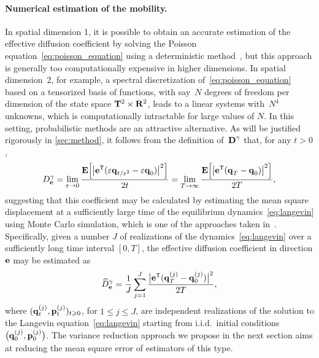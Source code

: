 \documentclass[11pt,a4paper]{article}
\begin{document}
\paragraph{Numerical estimation of the mobility.}
In spatial dimension 1,
it is possible to obtain an accurate estimation of the effective diffusion coefficient by solving the Poisson equation~\eqref{eq:poisson_equation} using a deterministic method~\cite{roussel2018spectral},
but this approach is generally too computationally expensive in higher dimensions.
In spatial dimension~2, for example,
a spectral discretization of~\eqref{eq:poisson_equation} based on a tensorized basis of functions,
with say~$N$ degrees of freedom per dimension of the state space $\mathbf T^2 \times \mathbf R^2$, leads to a linear systems with~$N^4$ unknowns,
which is computationally intractable for large values of $N$.
In this setting, probabilistic methods are an attractive alternative.
As will be justified rigorously in \cref{sec:method},
it follows from the definition of~$\boldsymbol{\mathbf D}^{\gamma}$ that,
for any $t > 0$,%
\begin{equation}
    \label{eq:einsteins_formula}
    D^{\gamma}_{\boldsymbol{\mathbf e}}
    =\lim_{\varepsilon \to 0} \frac{\mathbf{E}\Bigl[\bigl\lvert \boldsymbol{\mathbf e}^\mathsf T (\varepsilon \boldsymbol{\mathbf q}_{t/\varepsilon^2} - \varepsilon \boldsymbol{\mathbf q}_0) \bigr\rvert^2\Bigr]}{2 t}
    =\lim_{T \to \infty} \frac{\mathbf{E} \Bigl[\bigl\lvert \boldsymbol{\mathbf e}^\mathsf T (\boldsymbol{\mathbf q}_T - \boldsymbol{\mathbf q}_0) \bigr\rvert^2\Bigr]}{2T},
\end{equation}
suggesting that this coefficient may be calculated by
estimating the mean square displacement at a sufficiently large time of the equilibrium dynamics~\eqref{eq:langevin}
using Monte Carlo simulation,
which is one of the approaches taken in~\cite{MR2427108}.
Specifically, given a number $J$ of realizations of the dynamics~\eqref{eq:langevin} over a sufficiently long time interval $[0, T]$,
the effective diffusion coefficient in direction $\boldsymbol{\mathbf e}$ may be estimated as
\begin{equation}
    \label{eq:naive_estimator}
    \widehat D^{\gamma}_{\boldsymbol{\mathbf e}}
    = \frac{1}{J} \sum_{j=1}^{J} \frac{\bigl\lvert \boldsymbol{\mathbf e}^\mathsf T (\boldsymbol{\mathbf q}^{(j)}_T - \boldsymbol{\mathbf q}^{(j)}_0) \bigr\rvert^2}{2T},
\end{equation}
where $(\boldsymbol{\mathbf q}_t^{(j)}, \boldsymbol{\mathbf p}_t^{(j)})_{t \geqslant 0}$, for $1 \leq j \leq J$,
are independent realizations of the solution to the Langevin equation~\eqref{eq:langevin} starting from i.i.d.\ initial conditions $\bigl(\boldsymbol{\mathbf q}^{(j)}_0, \boldsymbol{\mathbf p}^{(j)}_0\bigr)$.
The variance reduction approach we propose in the next section aims at reducing the mean square error of estimators of this type.
\end{document}
